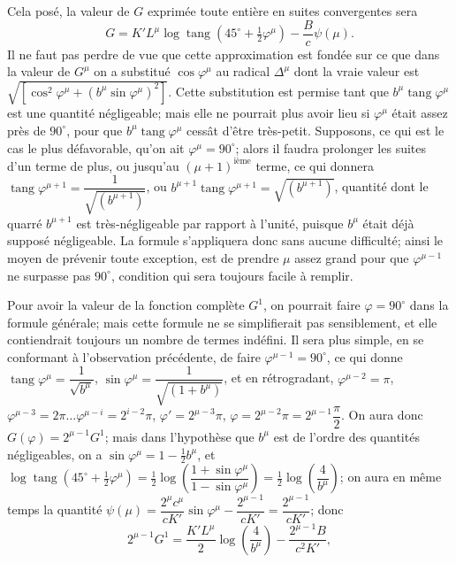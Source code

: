 \documentclass{article}
\begin{document}
Cela posé, la valeur de $G$ exprimée toute entière en suites convergentes sera
\[ G=K'L^{\mu}\log\operatorname{tang}(45^{\circ}+\tfrac{1}{2}\varphi^{\mu})-\frac{B}{c}\psi(\mu). \]
Il ne faut pas perdre de vue que cette approximation est fondée sur ce que dans la valeur de $G^{\mu}$ on a substitué $\cos\varphi^{\mu}$ au radical $\Delta^{\mu}$ dont la vraie valeur est $\sqrt{[\cos^{2}\varphi^{\mu}+(b^{\mu}\sin\varphi^{\mu})^{2}]}$. Cette substitution est permise tant que $b^{\mu}\operatorname{tang}\varphi^{\mu}$ est une quantité négligeable; mais elle ne pourrait plus avoir lieu si $\varphi^{\mu}$ était assez près de $90^{\circ}$, pour que $b^{\mu}\operatorname{tang}\varphi^{\mu}$ cessât d'être très-petit. Supposons, ce qui est le cas le plus défavorable, qu'on ait $\varphi^{\mu}=90^{\circ}$; alors il faudra prolonger les suites d'un terme de plus, ou jusqu'au $(\mu+1)^{\text{ième}}$ terme, ce qui donnera $\operatorname{tang}\varphi^{\mu+1}=\dfrac{1}{\sqrt{(b^{\mu+1})}}$, ou $b^{\mu+1}\operatorname{tang}\varphi^{\mu+1}=\sqrt{(b^{\mu+1})}$, quantité dont le quarré $b^{\mu+1}$ est très-négligeable par rapport à l'unité, puisque $b^{\mu}$ était déjà supposé négligeable. La formule s'appliquera donc sans aucune difficulté; ainsi le moyen de prévenir toute exception, est de prendre $\mu$ assez grand pour que $\varphi^{\mu-1}$ ne surpasse pas $90^{\circ}$, condition qui sera toujours facile à remplir.

Pour avoir la valeur de la fonction complète $G^{1}$, on pourrait faire $\varphi=90^{\circ}$ dans la formule générale; mais cette formule ne se simplifierait pas sensiblement, et elle contiendrait toujours un nombre de termes indéfini. Il sera plus simple, en se conformant à l'observation précédente, de faire $\varphi^{\mu-1}=90^{\circ}$, ce qui donne $\operatorname{tang}\varphi^{\mu}=\dfrac{1}{\sqrt{b^{\mu}}}$, $\sin\varphi^{\mu}=\dfrac{1}{\sqrt{(1+b^{\mu})}}$, et en rétrogradant, $\varphi^{\mu-2}=\pi$, $\varphi^{\mu-3}=2\pi\ldots\varphi^{\mu-i}=2^{i-2}\pi$, $\varphi'=2^{\mu-3}\pi$, $\varphi=2^{\mu-2}\pi=2^{\mu-1}\dfrac{\pi}{2}$. On aura donc $G(\varphi)=2^{\mu-1}G^{1}$; mais dans l'hypothèse que $b^{\mu}$ est de l'ordre des quantités négligeables, on a $\sin\varphi^{\mu}=1-\frac{1}{2}b^{\mu}$, et $\log\operatorname{tang}(45^{\circ}+\frac{1}{2}\varphi^{\mu})=\frac{1}{2}\log\left(\dfrac{1+\sin\varphi^{\mu}}{1-\sin\varphi^{\mu}}\right)=\frac{1}{2}\log\left(\dfrac{4}{b^{\mu}}\right)$; on aura en même temps la quantité $\psi(\mu)=\dfrac{2^{\mu}c^{\mu}}{cK'}\sin\varphi^{\mu}-\dfrac{2^{\mu-1}}{cK'}=\dfrac{2^{\mu-1}}{cK'}$; donc
\[ 2^{\mu-1}G^{1}=\frac{K'L^{\mu}}{2}\log\left(\frac{4}{b^{\mu}}\right)-\frac{2^{\mu-1}B}{c^{2}K'}, \]
\end{document}
